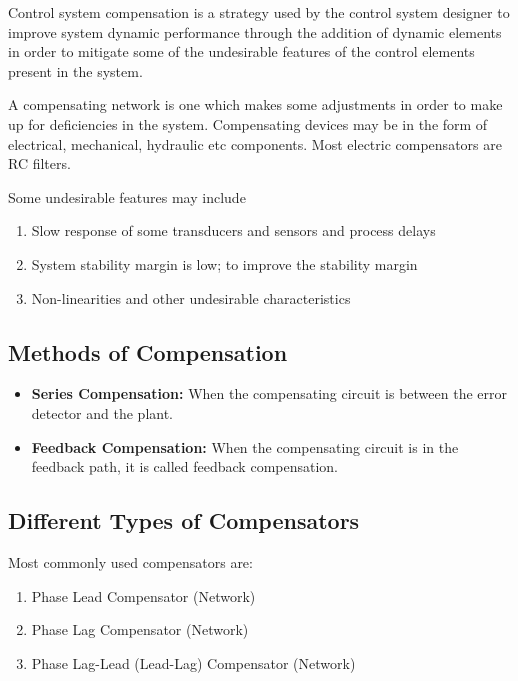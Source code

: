 \documentclass[
  14pt,
  a4paper,
  oneside,
  open=any,
  a4paper,
  14pt]{report}
\providecommand{\tightlist}{%
  \setlength{\itemsep}{0pt}\setlength{\parskip}{0pt}}\usepackage{longtable,booktabs,array}
\begin{document}
Control system compensation is a strategy used by the control system
designer to improve system dynamic performance through the addition of
dynamic elements in order to mitigate some of the undesirable features
of the control elements present in the system.

A compensating network is one which makes some adjustments in order to
make up for deficiencies in the system. Compensating devices may be in
the form of electrical, mechanical, hydraulic etc components. Most
electric compensators are RC filters.

Some undesirable features may include

\begin{enumerate}
\def\labelenumi{\arabic{enumi}.}
\item
  Slow response of some transducers and sensors and process delays
\item
  System stability margin is low; to improve the stability margin
\item
  Non-linearities and other undesirable characteristics
\end{enumerate}

\subsection{Methods of Compensation}\label{methods-of-compensation}

\begin{itemize}
\tightlist
\item
  \textbf{Series Compensation:} When the compensating circuit is between
  the error detector and the plant.
\item
  \textbf{Feedback Compensation:} When the compensating circuit is in
  the feedback path, it is called feedback compensation.
\end{itemize}

\subsection{Different Types of
Compensators}\label{different-types-of-compensators}

Most commonly used compensators are:

\begin{enumerate}
\def\labelenumi{\arabic{enumi}.}
\item
  Phase Lead Compensator (Network)
\item
  Phase Lag Compensator (Network)
\item
  Phase Lag-Lead (Lead-Lag) Compensator (Network)
\end{enumerate}
\end{document}
